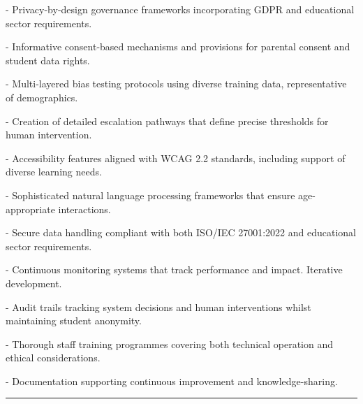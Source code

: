 \documentclass[14pt,a4paper]{article}
\begin{document}

- Privacy-by-design governance frameworks incorporating GDPR and educational sector requirements.

- Informative consent-based mechanisms and provisions for parental consent and student data rights.

- Multi-layered bias testing protocols using diverse training data, representative of demographics.

- Creation of detailed escalation pathways that define precise thresholds for human intervention.

- Accessibility features aligned with WCAG 2.2 standards, including support of diverse learning needs.

- Sophisticated natural language processing frameworks that ensure age-appropriate interactions.

- Secure data handling compliant with both ISO/IEC 27001:2022 and educational sector requirements.

- Continuous monitoring systems that track performance and impact. Iterative development.

- Audit trails tracking system decisions and human interventions whilst maintaining student anonymity.

- Thorough staff training programmes covering both technical operation and ethical considerations.

- Documentation supporting continuous improvement and knowledge-sharing.

\vspace{3em}
\hrule
\end{document}
